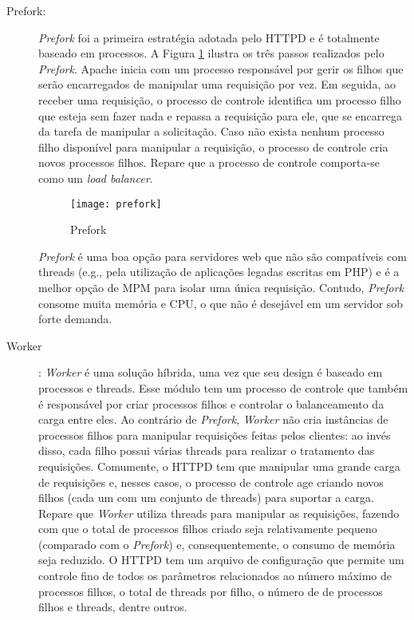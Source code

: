\begin{description}

	\item[Prefork:]

\emph{Prefork} foi a primeira estratégia adotada pelo HTTPD e é totalmente
baseado em processos. A Figura \ref{fig:prefork} ilustra os três passos
realizados pelo \emph{Prefork}. Apache inicia com um processo responsável
por gerir os filhos que serão encarregados de manipular uma requisição por vez.
Em seguida, ao receber uma requisição, o processo de controle identifica um
processo filho que esteja sem fazer nada e repassa a requisição para ele, que
se encarrega da tarefa de manipular a solicitação. Caso não exista nenhum
processo filho disponível para manipular a requisição, o processo de
controle cria novos processos filhos. Repare que a processo de controle
comporta-se como um \emph{load balancer}.

\begin{figure}[!h]
  \centering
  \texttt{[image: prefork]} 
  \caption{Prefork}
  \label{fig:prefork} 
\end{figure}

\emph{Prefork} é uma boa opção para servidores web que não são compatíveis
com threads (e.g., pela utilização de aplicações legadas escritas em PHP) e é a melhor opção de MPM
para isolar uma única requisição. Contudo, \emph{Prefork} consome muita
memória e CPU, o que não é desejável em um servidor sob forte demanda.

	\item [Worker]: \emph{Worker} é uma solução híbrida, uma vez que seu design é baseado em
processos e threads. Esse módulo tem um processo de controle que também é responsável
por criar processos filhos e controlar o balanceamento da carga entre eles.
Ao contrário de \emph{Prefork}, \emph{Worker} não cria instâncias
de processos filhos para manipular requisições feitas pelos clientes: ao
invés disso, cada filho possui várias threads para realizar
o tratamento das requisições. Comumente, o HTTPD tem que manipular uma
grande carga de requisições e, nesses casos, o processo de controle age criando
novos filhos (cada um com um conjunto de threads) para suportar a carga.
Repare que \emph{Worker} utiliza threads para manipular as requisições,
fazendo com que o total de processos filhos criado seja relativamente pequeno
(comparado com o \emph{Prefork}) e, consequentemente, o consumo de memória
seja reduzido. O HTTPD tem um arquivo de configuração que permite um controle fino de
todos os parâmetros relacionados ao número máximo de processos filhos, o total
de threads por filho, o número de  de processos filhos e threads,
dentre outros.


\end{description}
